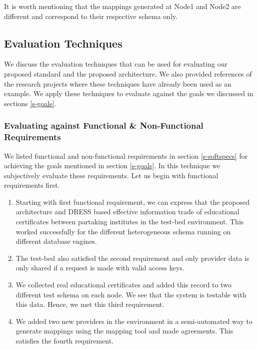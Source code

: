 \documentclass[12pt,a4paper,oneside]{book}
\begin{document}
It is worth mentioning that the mappings generated at Node1 and Node2 are different and correspond to their respective schema only. 

	\subsection{Evaluation Techniques}
	We discuss the evaluation techniques that can be used for evaluating our proposed standard and the proposed architecture. We also provided references of the research projects where these techniques have already been used as an example. We apply these techniques to evaluate against the goals we discussed in sections \ref{s-goals}. 
	
	
		\subsubsection{Evaluating against Functional \& Non-Functional Requirements}
		We listed functional and non-functional requirements in section \ref{s-softspecs} for achieving the goals mentioned in section \ref{s-goals}.  In this technique we subjectively evaluate these requirements. Let us begin with functional requirements first.
	\begin{enumerate}  

		\item Starting with first functional requirement, we can express that the proposed architecture and DRESS based effective information trade of educational certificates between partaking institutes in the test-bed environment. This worked successfully for the different heterogeneous schema running on different database engines. 

		\item The test-bed also satisfied the second requirement and only provider data is only shared if a request is made with valid access keys. 
	
		\item We collected real educational certificates and added this record to two different test schema on each node. We see that the system is testable with this data. Hence, we met this third requirement.
		
		\item We added two new providers in the environment in a semi-automated way to generate mappings using the mapping tool and made agreements. This satisfies the fourth requirement.

	\end{enumerate}
		
\end{document}
